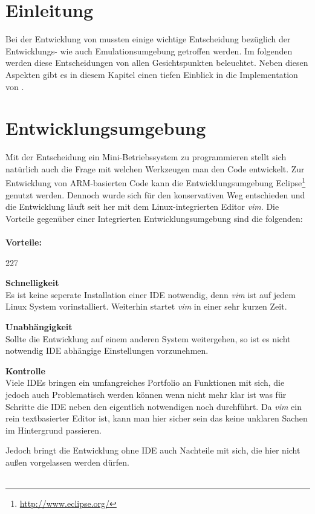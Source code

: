 \section{Einleitung}
Bei der Entwicklung von \mops mussten einige wichtige Entscheidung bez\"uglich der Entwicklungs- wie auch Emulationsumgebung getroffen werden. Im folgenden werden diese Entscheidungen von allen Gesichtspunkten beleuchtet. Neben diesen Aspekten gibt es in diesem Kapitel einen tiefen Einblick in die Implementation von \mops. 

\section{Entwicklungsumgebung}
Mit der Entscheidung ein Mini-Betriebssystem zu programmieren stellt sich nat\"urlich auch die Frage mit welchen Werkzeugen man den Code entwickelt. Zur Entwicklung von ARM-basierten Code kann die Entwicklungsumgebung Eclipse\footnote{\url{http://www.eclipse.org/}}  genutzt werden. Dennoch wurde sich f\"ur den konservativen Weg entschieden und die Entwicklung l\"auft seit her mit dem Linux-integrierten Editor \textit{vim}. Die Vorteile gegen\"uber einer Integrierten Entwicklungsumgebung sind die folgenden: \\\\
\textbf{Vorteile:}
\begin{dinglist}{227}
	\item{\textbf{Schnelligkeit}}\\
	 Es ist keine seperate Installation einer IDE notwendig, denn \textit{vim} ist auf jedem Linux System vorinstalliert. Weiterhin startet \textit{vim} in einer sehr kurzen Zeit.
	\item{\textbf{Unabh\"angigkeit}}\\
	Sollte die Entwicklung auf einem anderen System weitergehen, so ist es nicht notwendig IDE abh\"angige Einstellungen vorzunehmen.
	\item{\textbf{Kontrolle}}\\
	Viele IDEs bringen ein umfangreiches Portfolio an Funktionen mit sich, die jedoch auch Problematisch werden k\"onnen wenn nicht mehr klar ist was f\"ur Schritte die IDE neben den eigentlich notwendigen noch durchf\"uhrt. Da \textit{vim} ein rein textbasierter Editor ist, kann man hier sicher sein das keine unklaren Sachen im Hintergrund passieren.
\end{dinglist}
Jedoch bringt die Entwicklung ohne IDE auch Nachteile mit sich, die hier nicht au\ss en vorgelassen werden d\"urfen.\\ \\
